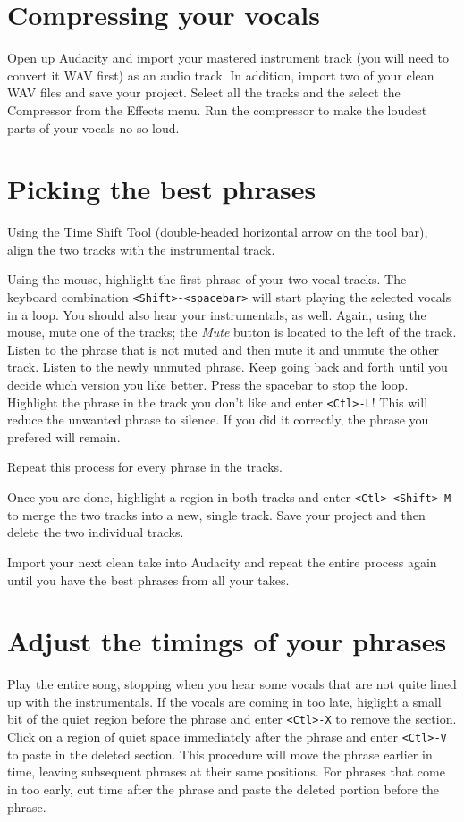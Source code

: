 \documentclass{article}
\begin{document}
\section*{Compressing your vocals}

Open up Audacity and import your mastered instrument track (you will
need to convert it WAV first) as an audio track.
In addition, import two of your clean WAV files and save your project.
Select all the tracks and the select the Compressor from the Effects
menu. Run the compressor to make the loudest parts of your vocals
no so loud.

\section*{Picking the best phrases}

Using the Time Shift Tool (double-headed horizontal arrow on
the tool bar), align the two tracks with the instrumental track.

Using the mouse, highlight the first phrase of your two vocal tracks.
The keyboard combination \verb!<Shift>-<spacebar>! will start playing the
selected vocals in a loop. You should also hear your instrumentals, as well.
Again, using the mouse, mute one of the tracks;
the {\it Mute} button is located to the
left of the track. Listen to the phrase that is not muted and then mute it
and unmute the other track. Listen to the newly unmuted phrase. Keep going
back and forth until you decide which version you like better. 
Press the spacebar to stop the loop. Highlight
the phrase in the track you don't like and enter \verb!<Ctl>-L!!
This will reduce the unwanted phrase to silence. If you did it correctly,
the phrase you prefered will remain.

Repeat this process for every phrase in the tracks.

Once you are done, highlight a region in both tracks and
enter \verb!<Ctl>-<Shift>-M! to merge the two tracks into a new, single track.
Save your project and then delete the two individual tracks.

Import your next clean take into Audacity and repeat the entire process
again until you have the best phrases from all your takes.

\section*{Adjust the timings of your phrases}

Play the entire song, stopping when you hear some vocals that are 
not quite lined up with the instrumentals. If the vocals are coming
in too late, higlight a small bit of the quiet region before the phrase
and enter \verb!<Ctl>-X! to remove the section.
Click on a region of quiet space
immediately after the phrase and enter \verb!<Ctl>-V! to paste in the deleted
section. This procedure will move the phrase earlier in time, leaving
subsequent phrases at their same positions.
For phrases that come in too early, cut time after the phrase
and paste the deleted portion before the phrase.
\end{document}
